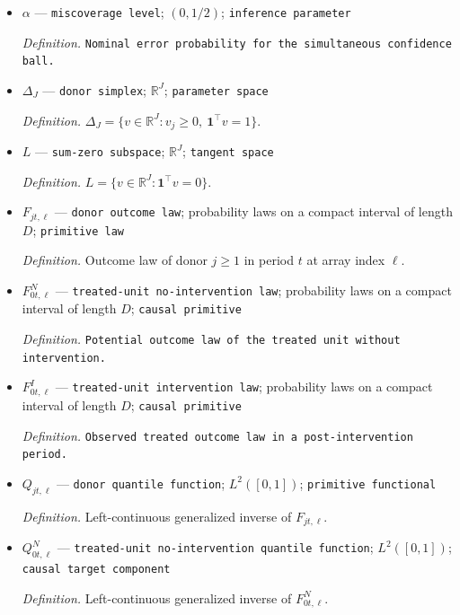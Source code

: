 \documentclass{article}
\begin{document}
\begin{itemize}
  \par\smallskip\noindent\emph{Definition.} Fixed weights satisfying \(\sum_{t\leq T_0}\pi_t=1\).
  \item \(\alpha\) --- \texttt{miscoverage level}; \((0,1/2)\); \texttt{inference parameter}
  \par\smallskip\noindent\emph{Definition.} \texttt{Nominal error probability for the simultaneous confidence ball.}
  \item \(\Delta_J\) --- \texttt{donor simplex}; \(\mathbb R^J\); \texttt{parameter space}
  \par\smallskip\noindent\emph{Definition.} \(\Delta_J=\{v\in\mathbb R^J:v_j\geq0,\ \mathbf 1^\top v=1\}\).
  \item \(L\) --- \texttt{sum-\allowbreak{}zero subspace}; \(\mathbb R^J\); \texttt{tangent space}
  \par\smallskip\noindent\emph{Definition.} \(L=\{v\in\mathbb R^J:\mathbf 1^\top v=0\}\).
  \item \(F_{jt,\ell}\) --- \texttt{donor outcome law}; probability laws on a compact interval of length \(D\); \texttt{primitive law}
  \par\smallskip\noindent\emph{Definition.} Outcome law of donor \(j\geq1\) in period \(t\) at array index \(\ell\).
  \item \(F^N_{0t,\ell}\) --- \texttt{treated-\allowbreak{}unit no-\allowbreak{}intervention law}; probability laws on a compact interval of length \(D\); \texttt{causal primitive}
  \par\smallskip\noindent\emph{Definition.} \texttt{Potential outcome law of the treated unit without intervention.}
  \item \(F^I_{0t,\ell}\) --- \texttt{treated-\allowbreak{}unit intervention law}; probability laws on a compact interval of length \(D\); \texttt{causal primitive}
  \par\smallskip\noindent\emph{Definition.} \texttt{Observed treated outcome law in a post-\allowbreak{}intervention period.}
  \item \(Q_{jt,\ell}\) --- \texttt{donor quantile function}; \(L^2([0,1])\); \texttt{primitive functional}
  \par\smallskip\noindent\emph{Definition.} Left-continuous generalized inverse of \(F_{jt,\ell}\).
  \item \(Q^N_{0t,\ell}\) --- \texttt{treated-\allowbreak{}unit no-\allowbreak{}intervention quantile function}; \(L^2([0,1])\); \texttt{causal target component}
  \par\smallskip\noindent\emph{Definition.} Left-continuous generalized inverse of \(F^N_{0t,\ell}\).

\end{itemize}
\end{document}
